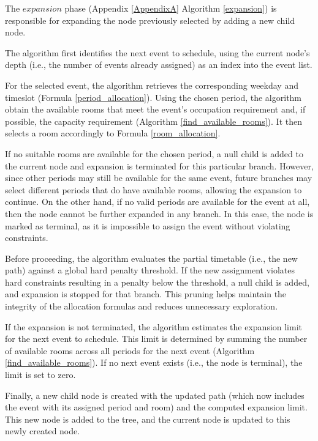 The \(expansion\) phase (Appendix \ref{AppendixA} Algorithm \ref{expansion}) is responsible for expanding the node previously selected by adding a new child node. 

The algorithm first identifies the next event to schedule, using the current node's depth (i.e., the number of events already assigned) as an index into the event list. %

For the selected event, the algorithm retrieves the corresponding weekday and timeslot (Formula \ref{period_allocation}). Using the chosen period, the algorithm obtain the available rooms that meet the event’s occupation requirement and, if possible, the capacity requirement (Algorithm \ref{find_available_rooms}). It then selects a room accordingly to Formula \ref{room_allocation}. 

If no suitable rooms are available for the chosen period, a null child is added to the current node and expansion is terminated for this particular branch. However, since other periods may still be available for the same event, future branches may select different periods that do have available rooms, allowing the expansion to continue. On the other hand, if no valid periods are available for the event at all, then the node cannot be further expanded in any branch. In this case, the node is marked as terminal, as it is impossible to assign the event without violating constraints.

Before proceeding, the algorithm evaluates the partial timetable (i.e., the new path) against a global hard penalty threshold. If the new assignment violates hard constraints resulting in a penalty below the threshold, a null child is added, and expansion is stopped for that branch. This pruning helps maintain the integrity of the allocation formulas and reduces unnecessary exploration.

If the expansion is not terminated, the algorithm estimates the expansion limit for the next event to schedule. This limit is determined by summing the number of available rooms across all periods for the next event (Algorithm \ref{find_available_rooms}). If no next event exists (i.e., the node is terminal), the limit is set to zero.

Finally, a new child node is created with the updated path (which now includes the event with its assigned period and room) and the computed expansion limit. This new node is added to the tree, and the current node is updated to this newly created node.

